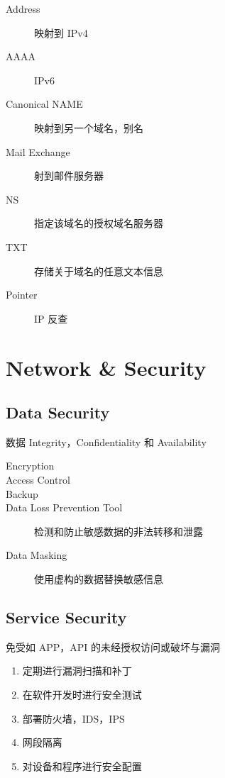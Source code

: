 \documentclass[11pt,journal,compsoc]{IEEEtran}
\begin{document}
\begin{description}
    \item[Address] 映射到 IPv4

    \item[AAAA] IPv6

    \item[Canonical NAME] 映射到另一个域名，别名

    \item[Mail Exchange] 射到邮件服务器

    \item[NS] 指定该域名的授权域名服务器

    \item[TXT] 存储关于域名的任意文本信息

    \item[Pointer] IP 反查
\end{description}


\section{Network \& Security}


\subsection{Data Security}

数据 Integrity，Confidentiality 和 Availability

\begin{description}
    \item[Encryption]
    \item[Access Control]
    \item[Backup]
    \item[Data Loss Prevention Tool] 检测和防止敏感数据的非法转移和泄露
    \item[Data Masking] 使用虚构的数据替换敏感信息
\end{description}


\subsection{Service Security}

免受如 APP，API 的未经授权访问或破坏与漏洞

\begin{enumerate}
    \item 定期进行漏洞扫描和补丁

    \item 在软件开发时进行安全测试

    \item 部署防火墙，IDS，IPS

    \item 网段隔离

    \item 对设备和程序进行安全配置
\end{enumerate}
\end{document}
